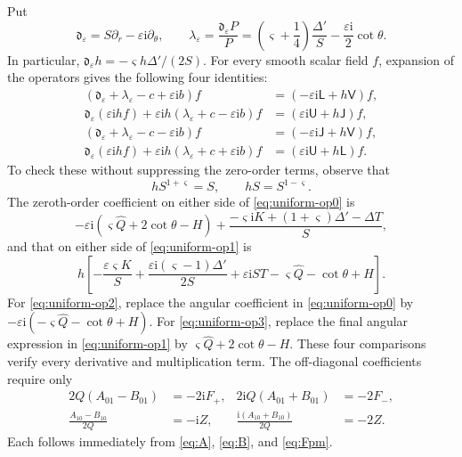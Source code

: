 \documentclass[11pt,a4paper]{article}
\numberwithin{equation}{section}
\theoremstyle{definition}
\theoremstyle{remark}
\newcommand{\I}{\mathrm i}
\begin{document}
Put
\[
 \mathfrak d_\varepsilon=S\partial_r-\varepsilon\I\partial_\theta,
 \qquad
 \lambda_\varepsilon
   =\frac{\mathfrak d_\varepsilon P}{P}
   =\left(\varsigma+\frac14\right)\frac{\Delta'}{S}
         -\frac{\varepsilon\I}{2}\cot\theta.
\]
In particular,
\(\mathfrak d_\varepsilon h=-\varsigma h\Delta'/(2S)\).
For every smooth scalar field \(f\), expansion of the operators gives
the following four identities:
\begin{align}
 (\mathfrak d_\varepsilon+\lambda_\varepsilon-c
                    +\varepsilon\I b)f
   &=(-\varepsilon\I\mathsf L+h\mathsf V)f,
 \label{eq:uniform-op0}\\
 \mathfrak d_\varepsilon(\varepsilon\I h f)
   +\varepsilon\I h(\lambda_\varepsilon+c-\varepsilon\I b)f
   &=(\varepsilon\I\mathsf U+h\mathsf J)f,
 \label{eq:uniform-op1}\\
 (\mathfrak d_\varepsilon+\lambda_\varepsilon-c
                    -\varepsilon\I b)f
   &=(-\varepsilon\I\mathsf J+h\mathsf V)f,
 \label{eq:uniform-op2}\\
 \mathfrak d_\varepsilon(\varepsilon\I h f)
   +\varepsilon\I h(\lambda_\varepsilon+c+\varepsilon\I b)f
   &=(\varepsilon\I\mathsf U+h\mathsf L)f.
 \label{eq:uniform-op3}
\end{align}
To check these without suppressing the zero-order terms, observe that
\[
 hS^{1+\varsigma}=S,\qquad hS=S^{1-\varsigma}.
\]
The zeroth-order coefficient on either side of
\eqref{eq:uniform-op0} is
\[
 -\varepsilon\I(\varsigma\widehat Q+2\cot\theta-H)
 +\frac{-\varsigma\I K+(1+\varsigma)\Delta'-\Delta T}{S},
\]
and that on either side of \eqref{eq:uniform-op1} is
\[
 h\left[
 -\frac{\varepsilon\varsigma K}{S}
 +\frac{\varepsilon\I(\varsigma-1)\Delta'}{2S}
 +\varepsilon\I ST-\varsigma\widehat Q-\cot\theta+H
 \right].
\]
For \eqref{eq:uniform-op2}, replace the angular coefficient in
\eqref{eq:uniform-op0} by
\(-\varepsilon\I(-\varsigma\widehat Q-\cot\theta+H)\).
For \eqref{eq:uniform-op3}, replace the final angular expression in
\eqref{eq:uniform-op1} by
\(\varsigma\widehat Q+2\cot\theta-H\).
These four comparisons verify every derivative and multiplication term.
The off-diagonal coefficients require only
\begin{align}
 2Q(A_{01}-B_{01})&=-2\I F_+,
 &2\I Q(A_{01}+B_{01})&=-2F_-,\nonumber\\
 \frac{A_{10}-B_{10}}{2Q}&=-\I Z,
 &\frac{\I(A_{10}+B_{10})}{2Q}&=-2Z.
 \label{eq:uniform-couplings}
\end{align}
Each follows immediately from \eqref{eq:A}, \eqref{eq:B}, and
\eqref{eq:Fpm}.
\end{document}
